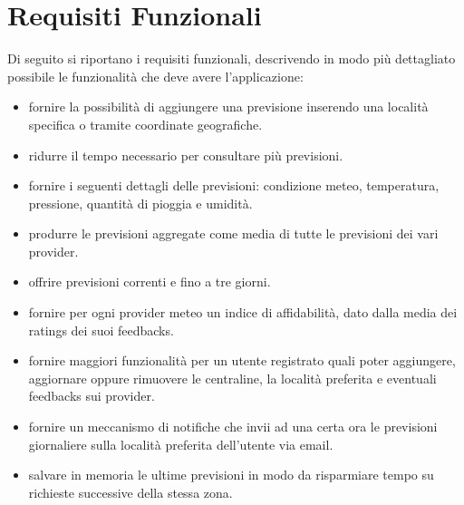 	\section{Requisiti Funzionali} %
	Di seguito si riportano i requisiti funzionali, descrivendo in modo più dettagliato possibile le funzionalità che deve avere l'applicazione:
	 \begin{itemize}
	 \item fornire la possibilità di aggiungere una previsione inserendo una località specifica o tramite coordinate geografiche.
	\item ridurre il tempo necessario per consultare più previsioni.
	\item fornire i seguenti dettagli delle previsioni: condizione meteo, temperatura, pressione, quantità di pioggia e umidità.
	\item produrre le previsioni aggregate come media di tutte le previsioni dei vari provider.
	\item offrire previsioni correnti e fino a tre giorni.
	\item fornire per ogni provider meteo un indice di affidabilità, dato dalla media dei ratings dei suoi feedbacks.
	\item fornire maggiori funzionalità per un utente registrato quali poter aggiungere, aggiornare oppure rimuovere le centraline, la località preferita e eventuali feedbacks sui provider.
	\item fornire un meccanismo di notifiche che invii ad una certa ora le previsioni giornaliere sulla località preferita dell'utente via email.
	\item salvare in memoria le ultime previsioni in modo da risparmiare tempo su richieste successive della stessa zona. 
	

	\end{itemize}
